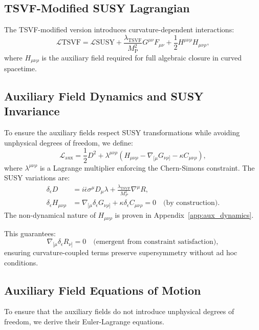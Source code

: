 \documentclass[12pt, onecolumn]{article}
\theoremstyle{definition}
\newcommand{\tsvf}{\lambda_{\mathrm{TSVF}}}
\newcommand{\Mp}{M_{\mathrm{P}}}
\numberwithin{equation}{section}
\begin{document}
\subsection{TSVF-Modified SUSY Lagrangian}
The TSVF-modified version introduces curvature-dependent interactions:
\begin{equation}
\mathcal{L}{\text{TSVF}} = \mathcal{L}{\text{SUSY}} + \frac{\tsvf}{\Mp^2} G^{\mu\nu} F_{\mu\nu} + \frac{1}{2} H^{\mu\nu\rho} H_{\mu\nu\rho},
\end{equation}
where $H_{\mu\nu\rho}$ is the auxiliary field required for full algebraic closure in curved spacetime.

\subsection{Auxiliary Field Dynamics and SUSY Invariance}
\label{subsec:auxiliary}

To ensure the auxiliary fields respect SUSY transformations while avoiding unphysical degrees of freedom, we define:
\begin{equation}
\mathcal{L}_{\text{aux}} = \frac{1}{2}D^2 + \lambda^{\mu\nu\rho}\left(H_{\mu\nu\rho} - \nabla_{[\mu}G_{\nu\rho]} - \kappa C_{\mu\nu\rho}\right),
\end{equation}
where \(\lambda^{\mu\nu\rho}\) is a Lagrange multiplier enforcing the Chern-Simons constraint. The SUSY variations are:
\begin{align}
\delta_\epsilon D &= i\bar{\epsilon}\sigma^\mu D_\mu\lambda + \frac{\tsvf}{M_P^2}\nabla^\mu R, \\
\delta_\epsilon H_{\mu\nu\rho} &= \nabla_{[\mu}\delta_\epsilon G_{\nu\rho]} + \kappa\delta_\epsilon C_{\mu\nu\rho} = 0 \quad \text{(by construction)}. 
\end{align}
The non-dynamical nature of \(H_{\mu\nu\rho}\) is proven in Appendix~\ref{app:aux_dynamics}.

This guarantees:
\begin{equation}
\nabla_{[\mu}\delta_\epsilon R_{\nu]} = 0 \quad \text{(emergent from constraint satisfaction)},
\end{equation}
ensuring curvature-coupled terms preserve supersymmetry without ad hoc conditions.

\subsection{Auxiliary Field Equations of Motion}
To ensure that the auxiliary fields do not introduce unphysical degrees of freedom, we derive their Euler-Lagrange equations.
\end{document}
